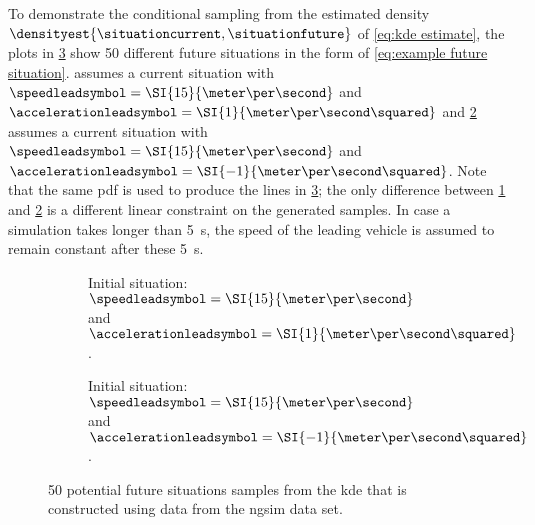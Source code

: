 To demonstrate the conditional sampling from the estimated density $\densityest{\situationcurrent,\situationfuture}$ of \cref{eq:kde estimate}, the plots in \cref{fig:speed profiles} show 50 different future situations in the form of \cref{eq:example future situation}.
 assumes a current situation with $\speedleadsymbol=\SI{15}{\meter\per\second}$ and $\accelerationleadsymbol=\SI{1}{\meter\per\second\squared}$ and \cref{fig:speed profiles decelerating} assumes a current situation with $\speedleadsymbol=\SI{15}{\meter\per\second}$ and $\accelerationleadsymbol=\SI{-1}{\meter\per\second\squared}$.
Note that the same \ac{pdf} is used to produce the lines in \cref{fig:speed profiles}; the only difference between \cref{fig:speed profiles accelerating} and \cref{fig:speed profiles decelerating} is a different linear constraint on the generated samples.
In case a simulation takes longer than \SI{5}{\second}, the speed of the leading vehicle is assumed to remain constant after these \SI{5}{\second}.

\setlength{\figurewidth}{.49\linewidth}
\setlength{\figureheight}{.7\figurewidth}
\begin{figure}
	\centering
	\begin{subfigure}{.49\linewidth}
		\centering
		
		\caption{Initial situation: $\speedleadsymbol=\SI{15}{\meter\per\second}$ and $\accelerationleadsymbol=\SI{1}{\meter\per\second\squared}$.}
		\label{fig:speed profiles accelerating}
	\end{subfigure}
	\begin{subfigure}{.49\linewidth}
		\centering
		
		\caption{Initial situation: $\speedleadsymbol=\SI{15}{\meter\per\second}$ and $\accelerationleadsymbol=\SI{-1}{\meter\per\second\squared}$.}
		\label{fig:speed profiles decelerating}
	\end{subfigure}
	\caption{50 potential future situations samples from the \ac{kde} that is constructed using data from the \ac{ngsim} data set.}
	\label{fig:speed profiles}
\end{figure}

